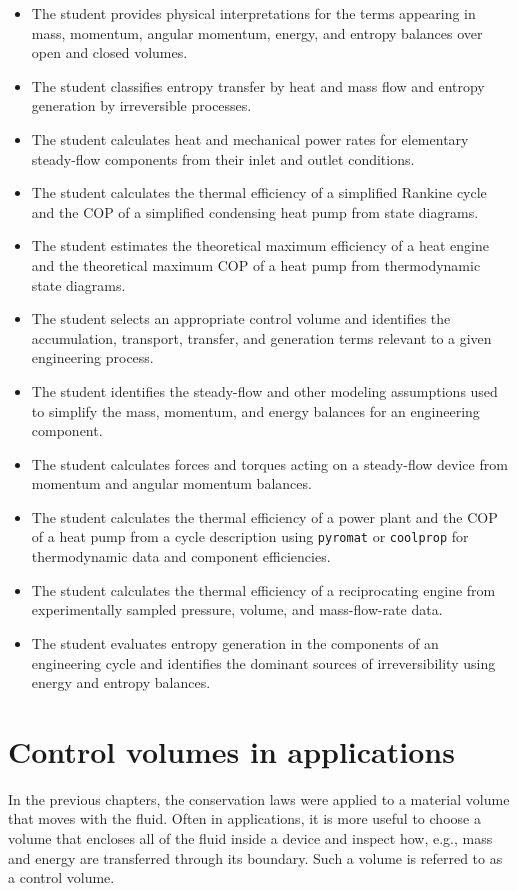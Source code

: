 \begin{itemize}
    \item[\elementary] The student provides physical interpretations for the terms appearing in mass, momentum, angular momentum, energy, and entropy balances over open and closed volumes.
    \item[\elementary] The student classifies entropy transfer by heat and mass flow and entropy generation by irreversible processes.
    \item[\elementary] The student calculates heat and mechanical power rates for elementary steady-flow components from their inlet and outlet conditions.
    \item[\elementary] The student calculates the thermal efficiency of a simplified Rankine cycle and the COP of a simplified condensing heat pump from state diagrams.
    \item[\elementary] The student estimates the theoretical maximum efficiency of a heat engine and the theoretical maximum COP of a heat pump from thermodynamic state diagrams.
    \item[\intermediate] The student selects an appropriate control volume and identifies the accumulation, transport, transfer, and generation terms relevant to a given engineering process.
    \item[\intermediate] The student identifies the steady-flow and other modeling assumptions used to simplify the mass, momentum, and energy balances for an engineering component.
    \item[\intermediate] The student calculates forces and torques acting on a steady-flow device from momentum and angular momentum balances.
    \item[\intermediate] The student calculates the thermal efficiency of a power plant and the COP of a heat pump from a cycle description using \verb|pyromat| or \verb|coolprop| for thermodynamic data and component efficiencies.
    \item[\advanced] The student calculates the thermal efficiency of a reciprocating engine from experimentally sampled pressure, volume, and mass-flow-rate data.
    \item[\advanced] The student evaluates entropy generation in the components of an engineering cycle and identifies the dominant sources of irreversibility using energy and entropy balances.
\end{itemize}

\section{Control volumes in applications}
In the previous chapters, the conservation laws were applied to a material volume that moves with the fluid. Often in applications, it is more useful to choose a volume that encloses all of the fluid inside a device and inspect how, e.g., mass and energy are transferred through its boundary. Such a volume is referred to as a control volume.

